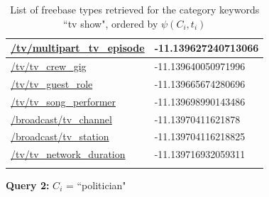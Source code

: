\documentclass[a4paper, twoside, 12pt]{report}
\begin{document}
\begin{longtable}{| p{} | p{} |}
\url{/tv/multipart_tv_episode} & -11.139627240713066 \\ \hline
\url{/tv/tv_crew_gig} & -11.139640050971996 \\ \hline
\url{/tv/tv_guest_role} & -11.139665674280696 \\ \hline
\url{/tv/tv_song_performer} & -11.139698990143486 \\ \hline
\url{/broadcast/tv_channel} & -11.13970411621878 \\ \hline
\url{/broadcast/tv_station} & -11.139704116218825 \\ \hline
\url{/tv/tv_network_duration} & -11.139716932059311 \\ \hline


\caption{List of freebase types retrieved for the category keywords ``tv show", ordered by $\psi(C_i,t_i)$} 
\label{tab:tvshow}
\end{longtable}

\textbf{Query 2:} $C_{i}$ = ``politician"
\end{document}
